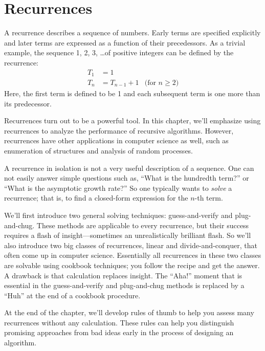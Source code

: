 \chapter{Recurrences}\label{chap:recurrences}


A recurrence describes a sequence of numbers.  Early terms are
specified explicitly and later terms are expressed as a function of
their precedessors.  As a trivial example, the sequence 1, 2, 3, \dots of positive integers can be defined by the recurrence:
\begin{align*}
T_1 & = 1 \\
T_n & = T_{n-1} + 1 & \text{(for $n \geq 2$)}
\end{align*}
Here, the first term is defined to be 1 and each subsequent term is
one more than its predecessor.

Recurrences turn out to be a powerful tool.  In this chapter, we'll
emphasize using recurrences to analyze the performance of recursive
algorithms.  However, recurrences have other applications in computer
science as well, such as enumeration of structures and analysis of
random processes.

A recurrence in isolation is not a very useful description of a
sequence.  One can not easily answer simple questions such as, ``What
is the hundredth term?'' or ``What is the asymptotic growth rate?''
So one typically wants to \emph{solve} a recurrence; that is, to find a
closed-form expression for the $n$-th term.

We'll first introduce two general solving techniques: guess-and-verify
and plug-and-chug.  These methods are applicable to every recurrence,
but their success requires a flash of insight---sometimes an
unrealistically brilliant flash.  So we'll also introduce two big
classes of recurrences, linear and divide-and-conquer, that often come
up in computer science.  Essentially all recurrences in these two
classes are solvable using cookbook techniques; you follow the recipe
and get the answer.  A drawback is that calculation replaces insight.
The ``Aha!''  moment that is essential in the guess-and-verify and
plug-and-chug methods is replaced by a ``Huh'' at the end of a
cookbook procedure.

At the end of the chapter, we'll develop rules of thumb to help you
assess many recurrences without any calculation.  These rules can help
you distinguish promising approaches from bad ideas early in the
process of designing an algorithm.

